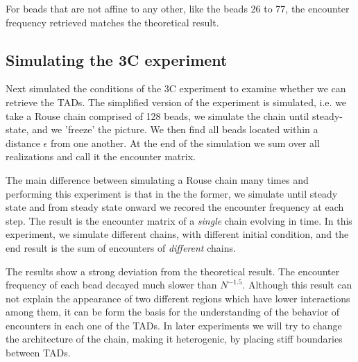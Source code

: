 \documentclass[12pt]{paper}
\begin{document}
For beads that are not affine to any other, like the beads 26 to 77, the encounter frequency retrieved matches the theoretical result. 

\subsection{Simulating the 3C experiment}
Next simulated  the conditions of the 3C experiment to examine whether we can retrieve the TADs. The simplified version of the experiment is simulated, i.e. we  take a Rouse chain comprised of 128 beads, we simulate the chain until steady-state, and we 'freeze' the picture. We then find all beads located within a distance $\epsilon$ from one another. At the end of the simulation we sum over all realizations and call it the encounter matrix. 

The main difference between simulating a Rouse chain many times and performing this experiment is that in the the former, we simulate until steady state and from steady state onward we recored the encounter frequency at each step. The result is the encounter matrix of a \textit{single} chain evolving in time. In this experiment, we simulate different chains, with different initial condition, and the end result is the sum of encounters of \textit{different} chains. 

The results show a strong deviation from the theoretical result. The encounter frequency of each bead decayed much slower than $N^{-1.5}$. Although this result can not explain the appearance of two different regions which have lower interactions among them, it can be form the basis for the understanding of the behavior of encounters in each one of the TADs. In later experiments we will try to change the architecture of the chain, making it heterogenic, by placing stiff boundaries between TADs. 
\end{document}
